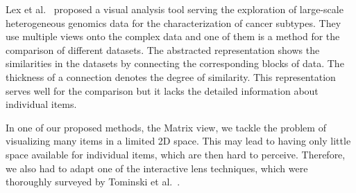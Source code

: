 \documentclass{bmcart}
\def\MatView {Matrix view\xspace}
\begin{document}

Lex et al.~\cite{Lex2012} proposed a visual analysis tool serving the exploration of large-scale heterogeneous genomics data for the characterization of cancer subtypes.
They use multiple views onto the complex data and one of them is a method for the comparison of different datasets.
The abstracted representation shows the similarities in the datasets by connecting the corresponding blocks of data. 
The thickness of a connection denotes the degree of similarity. 
This representation serves well for the comparison but it lacks the detailed information about individual items.

In one of our proposed methods, the \MatView, we tackle the problem of visualizing many items in a limited 2D space.
This may lead to having only little space available for individual items, which are then hard to perceive.
Therefore, we also had to adapt one of the interactive lens techniques, which were thoroughly surveyed by Tominski et al.~\cite{Tominski2014}.
\end{document}
